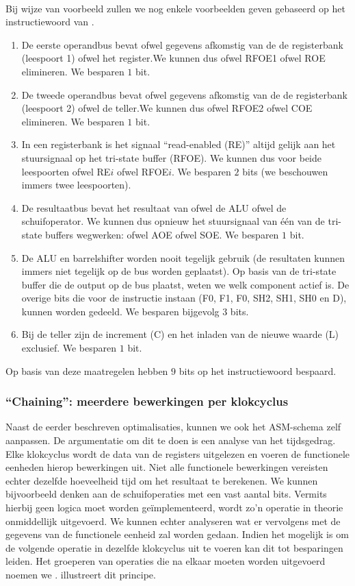 \paragraph{}
Bij wijze van voorbeeld zullen we nog enkele voorbeelden geven gebaseerd op het instructiewoord van .
\begin{enumerate}
 \item De eerste operandbus bevat ofwel gegevens afkomstig van de de registerbank (leespoort 1) ofwel het register.We kunnen dus ofwel \mbox{RFOE1} ofwel \mbox{ROE} elimineren. We besparen $1$ bit.
 \item De tweede operandbus bevat ofwel gegevens afkomstig van de de registerbank (leespoort 2) ofwel de teller.We kunnen dus ofwel \mbox{RFOE2} ofwel \mbox{COE} elimineren. We besparen $1$ bit.
 \item In een registerbank is het signaal ``read-enabled (RE)'' altijd gelijk aan het stuursignaal op het tri-state buffer (RFOE). We kunnen dus voor beide leespoorten ofwel \mbox{RE$i$} ofwel \mbox{RFOE$i$}. We besparen $2$ bits (we beschouwen immers twee leespoorten).
 \item De resultaatbus bevat het resultaat van ofwel de ALU ofwel de schuifoperator. We kunnen dus opnieuw het stuursignaal van \'e\'en van de tri-state buffers wegwerken: ofwel \mbox{AOE} ofwel \mbox{SOE}. We besparen $1$ bit.
 \item De ALU en barrelshifter worden nooit tegelijk gebruik (de resultaten kunnen immers niet tegelijk op de bus worden geplaatst). Op basis van de tri-state buffer die de output op de bus plaatst, weten we welk component actief is. De overige bits die voor de instructie instaan (\mbox{F0}, \mbox{F1}, \mbox{F0}, \mbox{SH2}, \mbox{SH1}, \mbox{SH0} en \mbox{D}), kunnen worden gedeeld. We besparen bijgevolg $3$ bits.
 \item Bij de teller zijn de increment (\mbox{C}) en het inladen van de nieuwe waarde (\mbox{L}) exclusief. We besparen $1$ bit.
\end{enumerate}
Op basis van deze maatregelen hebben $9$ bits op het instructiewoord bespaard.
\subsubsection{``Chaining'': meerdere bewerkingen per klokcyclus}
Naast de eerder beschreven optimalisaties, kunnen we ook het ASM-schema zelf aanpassen. De argumentatie om dit te doen is een analyse van het tijdsgedrag. Elke klokcyclus wordt de data van de registers uitgelezen en voeren de functionele eenheden hierop bewerkingen uit. Niet alle functionele bewerkingen vereisten echter dezelfde hoeveelheid tijd om het resultaat te berekenen. We kunnen bijvoorbeeld denken aan de schuifoperaties met een vast aantal bits. Vermits hierbij geen logica moet worden ge\"implementeerd, wordt zo'n operatie in theorie onmiddellijk uitgevoerd. We kunnen echter analyseren wat er vervolgens met de gegevens van de functionele eenheid zal worden gedaan. Indien het mogelijk is om de volgende operatie in dezelfde klokcyclus uit te voeren kan dit tot besparingen leiden. Het groeperen van operaties die na elkaar moeten worden uitgevoerd noemen we .  illustreert dit principe.
